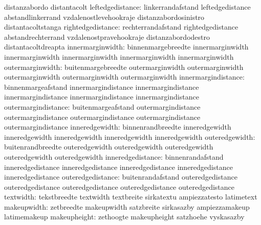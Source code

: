                                   distanzabordo                    distantacolt
                leftedgedistance: linkerrandafstand                leftedgedistance
                                  abstandlinkerrand                vzdalenostlevehookraje
                                  distanzabordosinistro            distantacoltstanga
               rightedgedistance: rechterrandafstand               rightedgedistance
                                  abstandrechterrand               vzdalenostpravehookraje
                                  distanzabordodestro              distantacoltdreapta
 innermarginwidth:   binnenmargebreedte  innermarginwidth
                     innermarginwidth    innermarginwidth
                     innermarginwidth    innermarginwidth
 outermarginwidth:   buitenmargebreedte  outermarginwidth
                     outermarginwidth    outermarginwidth
                     outermarginwidth    outermarginwidth
innermargindistance: binnenmargeafstand  innermargindistance
                     innermargindistance innermargindistance
                     innermargindistance innermargindistance
outermargindistance: buitenmargeafstand  outermargindistance
                     outermargindistance outermargindistance
                     outermargindistance outermargindistance
   inneredgewidth:   binnenrandbreedte  inneredgewidth
                     inneredgewidth     inneredgewidth
                     inneredgewidth     inneredgewidth
   outeredgewidth:   buitenrandbreedte  outeredgewidth
                     outeredgewidth     outeredgewidth
                     outeredgewidth     outeredgewidth
  inneredgedistance: binnenrandafstand  inneredgedistance
                     inneredgedistance  inneredgedistance
                     inneredgedistance  inneredgedistance
  outeredgedistance: buitenrandafstand  outeredgedistance
                     outeredgedistance  outeredgedistance
                     outeredgedistance  outeredgedistance
                       textwidth: tekstbreedte                     textwidth
                                  textbreite                       sirkatextu
                                  ampiezzatesto                    latimetext
                     makeupwidth: zetbreedte                       makeupwidth
                                  satzbreite                       sirkasazby
                                  ampiezzamakeup                   latimemakeup %
                    makeupheight: zethoogte                        makeupheight
                                  satzhoehe                        vyskasazby
